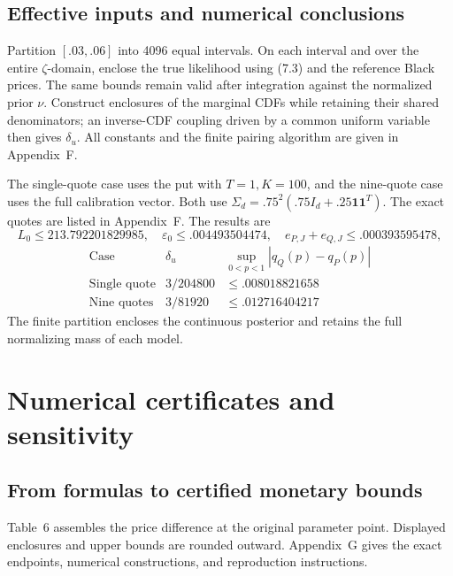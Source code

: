 \subsection{Effective inputs and numerical conclusions}

Partition \([.03,.06]\) into 4096 equal intervals.
On each interval and over the entire \(\zeta\)-domain, enclose the true likelihood using
(7.3) and the reference Black prices.
The same bounds remain valid after integration against the normalized prior \(\nu\).
Construct enclosures of the marginal CDFs while retaining their shared denominators;
an inverse-CDF coupling driven by a common uniform variable then gives \(\delta_u\).
All constants and the finite pairing algorithm are given in Appendix~F.

The single-quote case uses the put with \(T=1,K=100\), and the nine-quote case uses
the full calibration vector. Both use
\(\Sigma_d=.75^2(.75I_d+.25\mathbf1\mathbf1^T)\).
The exact quotes are listed in Appendix~F. The results are
\[
L_0\le213.792201829985,\quad
\varepsilon_0\le.004493504474,\quad
e_{P,J}+e_{Q,J}\le.000393595478,
\]
\[
\begin{array}{c|c|c}
\text{Case}&\delta_u&\sup_{0<p<1}|q_Q(p)-q_P(p)|\\ \hline
\text{Single quote}&3/204800&\le.008018821658\\
\text{Nine quotes}&3/81920&\le.012716404217
\end{array}
\tag{7.8}
\]
The finite partition encloses the continuous posterior and retains the full normalizing
mass of each model.

\section{Numerical certificates and sensitivity}

\subsection{From formulas to certified monetary bounds}

Table~6 assembles the price difference at the original parameter point.
Displayed enclosures and upper bounds are rounded outward. Appendix~G gives
the exact endpoints, numerical constructions, and reproduction instructions.

